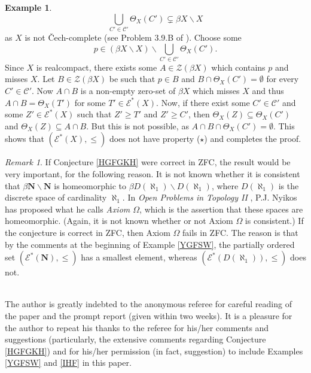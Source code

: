 \documentclass{amsart}
\theoremstyle{definition}
\newtheorem{example}[theorem]{Example}
\theoremstyle{remark}
\newtheorem{remark}[theorem]{Remark}
\theoremstyle{notation}
\numberwithin{equation}{section}
\begin{document}
\begin{example}
\[\bigcup_{C'\in{\mathscr C}'}\Theta_X(C')\subsetneq \beta X\backslash X\]
as $X$ is not \v{C}ech-complete (see Problem 3.9.B of \cite{E}). Choose some
\[p\in (\beta X\backslash X)\backslash\bigcup_{C'\in{\mathscr C}'}\Theta_X(C').\]
Since $X$ is realcompact, there exists some $A\in{\mathscr Z}(\beta X)$ which contains $p$ and misses $X$.  Let  $B\in{\mathscr Z}(\beta X)$ be such that $p\in B$ and  $B\cap\Theta_X(C')=\emptyset$ for every $C'\in{\mathscr C}'$. Now $A\cap B$ is a non-empty zero-set of $\beta X$ which misses $X$ and thus $A\cap B=\Theta_X(T')$ for some $T'\in{\mathscr E}^*(X)$. Now, if there exist some $C'\in {\mathscr C}'$ and some $Z'\in {\mathscr E}^*(X)$ such that $Z'\geq T'$ and $Z'\geq C'$, then $\Theta_X(Z)\subseteq\Theta_X(C')$ and $\Theta_X(Z)\subseteq A\cap B$. But this is not possible, as $A\cap B\cap\Theta_X(C')=\emptyset$. This  shows that $({\mathscr E}^*(X),\leq)$ does not have property ($\star$) and completes the proof.
\end{example}

\begin{remark}\label{JHD}
If Conjecture \ref{HGFGKH} were correct in ZFC, the result would be very important, for the following reason. It is not known whether it is consistent that  $\beta\mathbf{N}\backslash\mathbf{N}$ is homeomorphic to  $\beta D(\aleph_1)\backslash D(\aleph_1)$, where $D(\aleph_1)$ is the discrete space of cardinality $\aleph_1$. In {\em Open Problems in Topology II} \cite{Ny},  P.J. Nyikos has proposed what he calls {\em Axiom $\Omega$}, which is the assertion that these spaces are homeomorphic. (Again, it is not known whether or not Axiom $\Omega$ is consistent.) If the conjecture is correct in ZFC, then Axiom $\Omega$ fails in ZFC. The reason is that by the comments at the beginning of Example \ref{YGFSW}, the partially ordered set $({\mathscr E}^*(\mathbf{N}),\leq)$ has a smallest element, whereas $({\mathscr E}^*(D(\aleph_1)),\leq)$ does not.
\end{remark}

\\

The author is greatly indebted to the anonymous referee for careful reading of the paper and the prompt report (given within two weeks). It is a pleasure for the author to repeat his thanks to the referee for his/her comments and suggestions (particularly, the extensive comments regarding Conjecture \ref{HGFGKH}) and for  his/her  permission (in fact, suggestion) to include Examples \ref{YGFSW} and \ref{IHF} in this paper.
\end{document}
